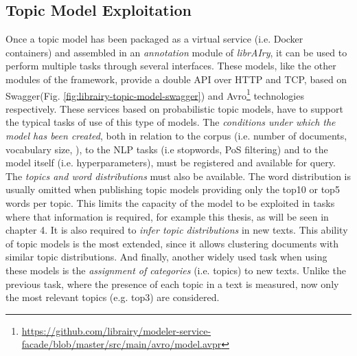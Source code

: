 \subsection{Topic Model Exploitation}

Once a topic model has been packaged as a virtual service (i.e. Docker containers) and assembled in an \textit{annotation} module of \textit{librAIry}, it can be used to perform multiple tasks through several interfaces. These models, like the other modules of the framework, provide a double API over HTTP and TCP, based on Swagger(Fig. \ref{fig:librairy-topic-model-swagger}) and Avro\footnote{\url{https://github.com/librairy/modeler-service-facade/blob/master/src/main/avro/model.avpr}} technologies respectively. These services based on probabilistic topic models, have to support the typical tasks of use of this type of models. The \textit{conditions under which the model has been created}, both in relation to the corpus (i.e. number of documents, vocabulary size, ), to the NLP tasks (i.e stopwords, PoS filtering) and to the model itself (i.e. hyperparameters), must be registered and available for query. The \textit{topics and  word distributions} must also be available. The word distribution is usually omitted when publishing topic models providing only the top10 or top5 words per topic. This limits the capacity of the model to be exploited in tasks where that information is required, for example this thesis, as will be seen in chapter 4. It is also required to \textit{infer topic distributions} in new texts. This ability of topic models is the most extended, since it allows clustering documents with similar topic distributions. And finally, another widely used task when using these models is the \textit{assignment of categories} (i.e. topics) to new texts. Unlike the previous task, where the presence of each topic in a text is measured, now only the most relevant topics (e.g. top3) are considered. 

